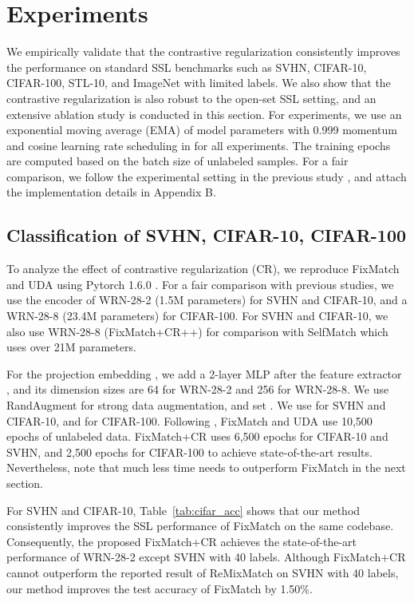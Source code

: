 \documentclass[letterpaper]{article} \usepackage{aaai22}  \usepackage{times}  \usepackage{helvet}  \usepackage{courier}  \usepackage[hyphens]{url}  \usepackage{graphicx} \urlstyle{rm} \def\UrlFont{\rm}  \usepackage{natbib}  \usepackage{caption} \DeclareCaptionStyle{ruled}{labelfont=normalfont,labelsep=colon,strut=off} \frenchspacing  \setlength{\pdfpagewidth}{8.5in}  \setlength{\pdfpageheight}{11in}  \usepackage{algorithm}
\begin{document}
\section{Experiments} \label{sec:EXP}
We empirically validate that the contrastive regularization consistently improves the performance on standard SSL benchmarks such as SVHN, CIFAR-10, CIFAR-100, STL-10, and ImageNet with limited labels.
We also show that the contrastive regularization is also robust to the open-set SSL setting, and an extensive ablation study is conducted in this section.
For experiments, we use an exponential moving average (EMA) of model parameters \cite{tarvainen2017mean} with 0.999 momentum and cosine learning rate scheduling in \cite{sohn2020fixmatch} for all experiments.
The training epochs are computed based on the batch size of unlabeled samples.
For a fair comparison, we follow the experimental setting in the previous study \cite{sohn2020fixmatch}, and attach the implementation details in Appendix B.

\subsection{Classification of SVHN, CIFAR-10, CIFAR-100}
To analyze the effect of contrastive regularization (CR), we reproduce FixMatch and UDA using Pytorch 1.6.0 \cite{NEURIPS2019_9015}.
For a fair comparison with previous studies, we use the encoder of WRN-28-2 (1.5M parameters) for SVHN and CIFAR-10, and a WRN-28-8 (23.4M parameters) for CIFAR-100.
For SVHN and CIFAR-10, we also use WRN-28-8 (FixMatch+CR++) for comparison with SelfMatch \cite{kim2021selfmatch} which uses over 21M parameters.

For the projection embedding , we add a 2-layer MLP after the feature extractor , and its dimension sizes are 64 for WRN-28-2 and 256 for WRN-28-8.
We use RandAugment \cite{cubuk2020randaugment} for strong data augmentation, and set .
We use  for SVHN and CIFAR-10, and  for CIFAR-100.
Following \cite{sohn2020fixmatch}, FixMatch and UDA use 10,500 epochs of unlabeled data.
FixMatch+CR uses 6,500 epochs for CIFAR-10 and SVHN, and 2,500 epochs for CIFAR-100 to achieve state-of-the-art results.
Nevertheless, note that much less time needs to outperform FixMatch in the next section.

For SVHN and CIFAR-10, Table~\ref{tab:cifar_acc} shows that our method consistently improves the SSL performance of FixMatch on the same codebase.
Consequently, the proposed FixMatch+CR achieves the state-of-the-art performance of WRN-28-2 except SVHN with 40 labels.
Although FixMatch+CR cannot outperform the reported result of ReMixMatch \cite{berthelot2019remixmatch} on SVHN with 40 labels, our method improves the test accuracy of FixMatch by 1.50\%.
\end{document}
